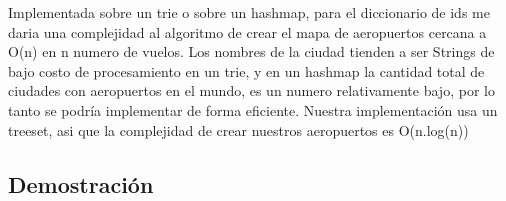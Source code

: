 Implementada sobre un trie o sobre un hashmap, para el diccionario de ids me daria una complejidad al algoritmo de crear el mapa de aeropuertos cercana a O(n) en n numero de vuelos. Los nombres de la ciudad tienden a ser Strings de bajo costo de procesamiento en un trie, y en un hashmap la cantidad total de ciudades con aeropuertos en el mundo, es un numero relativamente bajo, por lo tanto se podr\'ia implementar de forma eficiente.
Nuestra implementaci\'on usa un treeset, asi que la complejidad de crear nuestros aeropuertos es O(n.log(n))



\newpage

\subsection{Demostración}

